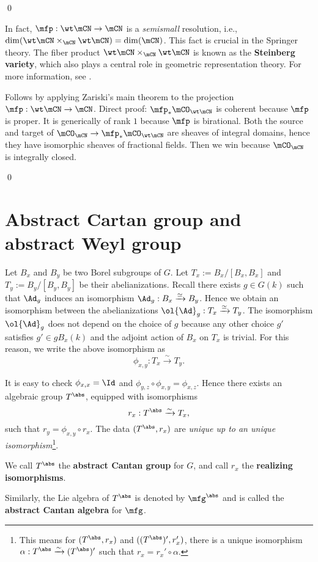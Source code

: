 	\qed

	\begin{rem}
		In fact, $\mfp:\wt\mCN \to \mCN$ is a \emph{semismall} resolution, i.e., $\dim(\wt\mCN\mt_\mCN\wt\mCN) = \dim(\mCN)$. This fact is crucial in the Springer theory. The fiber product $\wt\mCN\mt_\mCN\wt\mCN$ is known as the \textbf{Steinberg variety}, which also plays a central role in geometric representation theory. For more information, see \cite{CG}.
	\end{rem}


		Follows by applying Zariski's main theorem to the projection $\mfp: \wt\mCN \to \mCN$. Direct proof: $\mfp_* \mCO_{\wt\mCN}$ is coherent because $\mfp$ is proper. It is generically of rank $1$ because $\mfp$ is birational. Both the source and target of $\mCO_\mCN\to \mfp_* \mCO_{\wt\mCN}$ are sheaves of integral domains, hence they have isomorphic sheaves of fractional fields. Then we win because $\mCO_\mCN$ is integrally closed.

	\qed


	\appendix

	\section{Abstract Cartan group and abstract Weyl group}
	\label{app-abs}

	\begin{constr}
		Let $B_x$ and $B_y$ be two Borel subgroups of $G$. Let $T_x:=B_x/[B_x,B_x]$ and $T_y:=B_y/[B_y,B_y]$ be their abelianizations. Recall there exists $g\in G(k)$ such that $\Ad_g$ induces an isomorphism $\Ad_g: B_x \xrightarrow{\simeq} B_y$. Hence we obtain an isomorphism between the abelianizations $\ol{\Ad}_g: T_x \xrightarrow{\simeq} T_y$.
		The isomorphism $\ol{\Ad}_g$ does not depend on the choice of $g$ because any other choice $g'$ satisfies $g'\in g B_x(k)$ and the adjoint action of $B_x$ on $T_x$ is trivial. For this reason, we write the above isomorphism as
		\[
			\phi_{x,y}: T_x \xrightarrow{\sim} T_y.
		\]

		It is easy to check $\phi_{x,x}=\Id$ and $\phi_{y,z}\circ \phi_{x,y}=\phi_{x,z}$. Hence there exists an algebraic group $T^\abs$, equipped with isomorphisms
		\[
			r_x: T^\abs \xrightarrow{\sim} T_x,
		\]
		such that $r_y = \phi_{x,y}\circ r_x$. The data $(T^\abs, r_x)$ are \emph{unique up to an unique isomorphism}\footnote{This means for $(T^\abs, r_x)$ and $((T^\abs)', r_x')$, there is a unique isomorphism $\alpha:T^\abs \xrightarrow{\sim} (T^\abs)'$ such that $r_x= r_x'\circ \alpha$.}.

		We call $T^\abs$ the \textbf{abstract Cantan group} for $G$, and call $r_x$ the \textbf{realizing isomorphisms}.

		Similarly, the Lie algebra of $T^\abs$ is denoted by $\mfg^\abs$ and is called the \textbf{abstract Cantan algebra} for $\mfg$.
	\end{constr}

